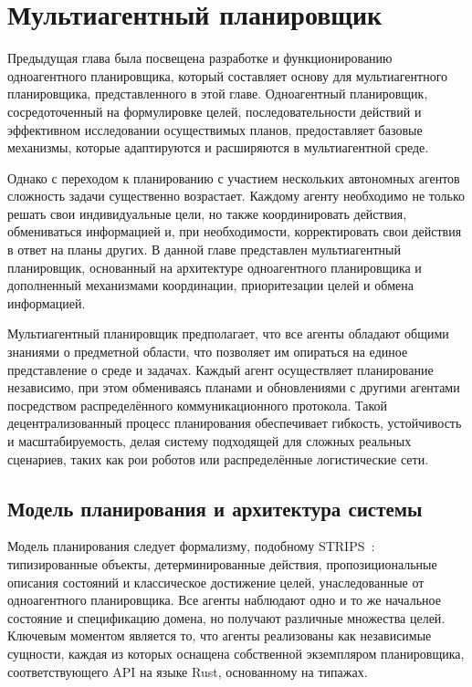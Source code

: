 \chapter{Мультиагентный планировщик}

Предыдущая глава была посвещена разработке и функционированию одноагентного планировщика,
который составляет основу для мультиагентного планировщика, представленного в этой главе.
Одноагентный планировщик, сосредоточенный на формулировке целей,
последовательности действий и эффективном исследовании осуществимых планов,
предоставляет базовые механизмы, которые адаптируются и расширяются в мультиагентной среде.

Однако с переходом к планированию с участием нескольких автономных агентов
сложность задачи существенно возрастает.
Каждому агенту необходимо не только решать свои индивидуальные цели,
но также координировать действия, обмениваться информацией
и, при необходимости, корректировать свои действия в ответ на планы других.
В данной главе представлен мультиагентный планировщик,
основанный на архитектуре одноагентного планировщика
и дополненный механизмами координации,
приоритезации целей и обмена информацией.

Мультиагентный планировщик предполагает,
что все агенты обладают общими знаниями о предметной области,
что позволяет им опираться на единое представление
о среде и задачах. Каждый агент осуществляет планирование независимо,
при этом обмениваясь планами и обновлениями с другими агентами
посредством распределённого коммуникационного протокола.
Такой децентрализованный процесс планирования обеспечивает гибкость,
устойчивость и масштабируемость, делая систему подходящей для сложных
реальных сценариев, таких как рои роботов или распределённые логистические сети.

\section{Модель планирования и архитектура системы}

Модель планирования следует формализму, подобному STRIPS~\cite{FIKES1971189}:
типизированные объекты, детерминированные действия,
пропозициональные описания состояний
и классическое достижение целей,
унаследованные от одноагентного планировщика.
Все агенты наблюдают одно и то же начальное состояние и спецификацию домена,
но получают различные множества целей.
Ключевым моментом является то, что агенты реализованы как независимые сущности,
каждая из которых оснащена собственной экземпляром
планировщика, соответствующего API на языке Rust, основанному на типажах.

